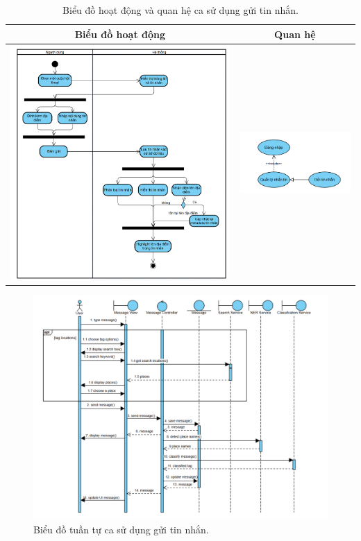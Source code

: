\begin{table}[H] %
    \centering
    \caption{Biểu đồ hoạt động và quan hệ ca sử dụng gửi tin nhắn.} %
    \label{tab:uc_send_message_diagrams} %
    \begin{tabular}{| c | c |}
        \hline
        \textbf{Biểu đồ hoạt động} & \textbf{Quan hệ} \\
        \hline
        \includegraphics[width=0.5\linewidth]{figures/c3/3-3-9-ad.png} %
        &
        \includegraphics[width=0.45\linewidth]{figures/c3/3-3-9-rd.png} \\ %
        \hline
    \end{tabular}
\end{table}

\begin{figure}[H]
    \centering
    \includegraphics[width=1\textwidth]{figures/c3/3-3-9-sd.png} %
    \caption{Biểu đồ tuần tự ca sử dụng gửi tin nhắn.}
    \label{fig:3-3-9-sequence-diagram}
\end{figure}